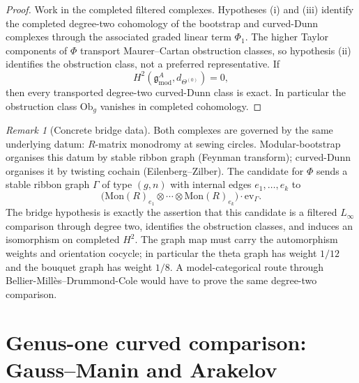 \documentclass[11pt]{amsart}
\theoremstyle{definition}
\theoremstyle{remark}
\newtheorem{remark}[theorem]{Remark}
\begin{document}
\begin{proof}
Work in the completed filtered complexes.  Hypotheses \textup{(i)}
and \textup{(iii)} identify the completed degree-two cohomology of
the bootstrap and curved-Dunn complexes through the associated graded
linear term \(\Phi_1\).  The higher Taylor components of \(\Phi\)
transport Maurer--Cartan obstruction classes, so hypothesis
\textup{(ii)} identifies the obstruction class, not a preferred
representative. If
\[
  H^2(\mathfrak{g}^A_{\mathrm{mod}}, d_{\Theta^{(0)}})=0,
\]
then every transported degree-two curved-Dunn class is exact.  In
particular the obstruction class \(\mathrm{Ob}_g\) vanishes in
completed cohomology.
\end{proof}

\begin{remark}[Concrete bridge data]%
\label{rem:bridge-provenance-standalone}%
Both complexes are governed by the same underlying datum:
$R$-matrix monodromy at sewing circles. Modular-bootstrap organises
this datum by stable ribbon graph (Feynman transform); curved-Dunn
organises it by twisting cochain (Eilenberg--Zilber). The candidate
for $\Phi$ sends a stable ribbon graph $\Gamma$ of type $(g,n)$ with
internal edges $e_1,\dots,e_k$ to
\[
  \bigl(\mathrm{Mon}(R)_{e_1}\otimes\cdots\otimes
  \mathrm{Mon}(R)_{e_k}\bigr)\cdot\mathrm{ev}_\Gamma .
\]
The bridge hypothesis is exactly the assertion that this candidate is
a filtered \(L_\infty\) comparison through degree two, identifies the
obstruction classes, and induces an isomorphism on completed $H^2$.
The graph map must carry the automorphism weights and orientation
cocycle; in particular the theta graph has weight \(1/12\) and the
bouquet graph has weight \(1/8\). A
model-categorical route through Bellier-Mill\`es--Drummond-Cole would
have to prove the same degree-two comparison.
\end{remark}

\section{Genus-one curved comparison: Gauss--Manin and Arakelov}
\label{sec:genus1-gauss-manin-standalone}
\end{document}
